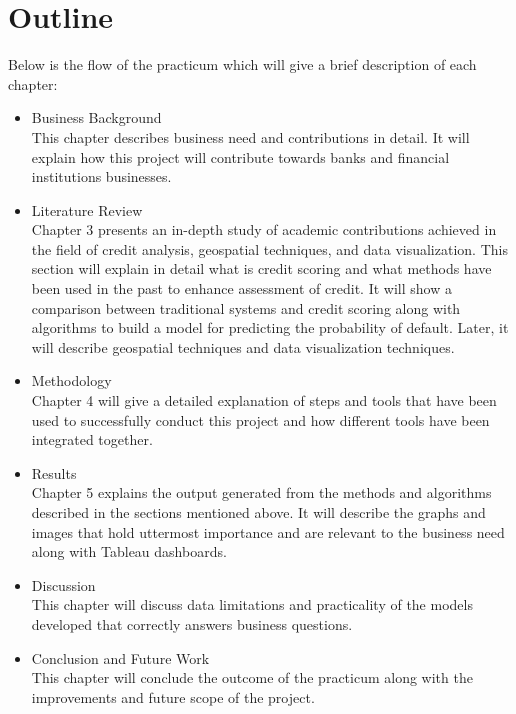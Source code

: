 \section{Outline}
Below is the flow of the practicum which will give a brief description of each chapter:
\begin{itemize}
\item Business Background \\ This chapter describes business need and contributions in detail. It will explain how this project will contribute towards banks and financial institutions businesses. 
\item Literature Review \\ Chapter 3 presents an in-depth study of academic contributions achieved in the field of credit analysis, geospatial techniques, and data visualization. This section will explain in detail what is credit scoring and what methods have been used in the past to enhance assessment of credit. It will show a comparison between traditional systems and credit scoring along with algorithms to build a model for predicting the probability of default. Later, it will describe geospatial techniques and data visualization techniques.
\item Methodology \\ Chapter 4 will give a detailed explanation of steps and tools that have been used to successfully conduct this project and how different tools have been integrated together.
\item Results \\ Chapter 5 explains the output generated from the methods and algorithms described in the sections mentioned above. It will describe the graphs and images that hold uttermost importance and are relevant to the business need along with Tableau dashboards.
\item Discussion \\ This chapter will discuss data limitations and practicality of the models developed that correctly answers business questions. 
\item Conclusion and Future Work \\ This chapter will conclude the outcome of the practicum along with the improvements and future scope of the project.
\end{itemize}
